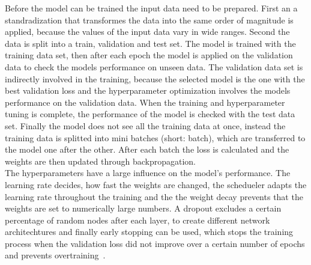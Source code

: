 Before the model can be trained the input data need to be prepared. First an a standradization that transformes the data into the same order of magnitude is applied, because the values of the input data vary in wide ranges.
Second the data is split into a train, validation and test set. The model is trained with the training data set, then after each epoch the model is applied on the validation data to check the models performance on unseen data.
The validation data set is indirectly involved in the training, because the selected model is the one with the best validation loss and the hyperparameter optimization involves the models performance on the validation data.
When the training and hyperparameter tuning is complete, the performance of the model is checked with the test data set. Finally the model does not see all the training data at once, instead the training data is splitted into mini batches (short: batch),
which are transferred to the model one after the other. After each batch the loss is calculated and the weights are then updated through backpropagation. \\

The hyperparameters have a large influence on the model's performance. The learning rate decides, how fast the weights are changed, the schedueler adapts the learning rate throughout the training
and the the weight decay prevents that the weights are set
to numerically large numbers. A dropout excludes a certain percentage of random nodes after each layer, to create different network architechtures and finally early stopping can be used, which stops the training process when the validation loss 
did not improve over a certain number of epochs and prevents overtraining~\cite{DL:2021}. 

